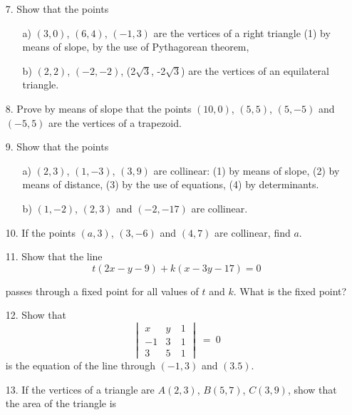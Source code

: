 \documentclass[]{amsbook}
\begin{document}

\begin{enumerate}
	\item [7.] Show that the points
    	\begin{enumerate}
    		\item [a)] $(3, 0)$, $(6, 4)$, $(-1, 3)$ are the vertices of a right
    		triangle (1) by means of slope, by the use of Pythagorean theorem,
    
    		\item [b)] $(2, 2)$, $(-2, -2)$, (2$\sqrt{3}$, -2$\sqrt{3}$) are the vertices
    		of an equilateral triangle.
    	\end{enumerate}
	
	\item [8.] Prove by means of slope that the points $(10, 0)$, $(5, 5)$, $(5, -5)$ and
	    $(-5, 5)$ are the vertices of a trapezoid.
	
	\item [9.] Show that the points
	    \begin{enumerate}
    		\item [a)] $(2, 3)$, $(1, -3)$, $(3, 9)$ are collinear: 
    		(1) by means of slope, 
    		(2) by means of distance, 
    		(3) by the use of equations,
    		(4) by determinants.

		    \item [b)] $(1, -2)$, $(2, 3)$ and $(-2, -17)$ are collinear.
	    \end{enumerate}
	
	\item [10.] If the points $(a, 3)$, $(3, -6)$ and $(4, 7)$ are collinear, find $a$.
	
	\item [11.] Show that the line
	    \begin{equation*}
	         t(2x - y - 9) + k(x - 3y - 17) = 0
	    \end{equation*}
	    
	    \noindent passes through a fixed point for all values of $t$ and $k$. 
	    What is the fixed point?
	
	\item [12.] Show that
    	\begin{equation*}
    	    \begin{vmatrix}
                x & y & \ 1 \\ 
                -1 & 3 & \ 1 \\ 
                3 & 5 & \ 1
            \end{vmatrix}
            \ =\ 0
    	\end{equation*}
    	is the equation of the line through $(-1, 3)$ and $(3. 5)$.
    
    \item [13.] If the vertices of a triangle are $A(2, 3)$, $B(5, 7)$, $C(3, 9)$, show
    that the area of the triangle is

\end{enumerate}
\end{document}
